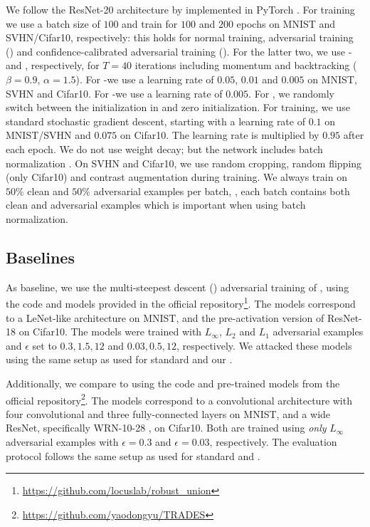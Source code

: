 We follow the ResNet-20 architecture by \cite{HeCVPR2016} implemented in PyTorch \citep{PaszkeNIPSWORK2017}. For training we use a batch size of $100$ and train for $100$ and $200$ epochs on MNIST and SVHN/Cifar10, respectively: this holds for normal training, adversarial training (\AdvTrain) and confidence-calibrated adversarial training (\ConfTrain). For the latter two, we use \PGD-\FCE and \PGD\FConf, respectively, for $T = 40$ iterations including momentum and backtracking ($\beta = 0.9$, $\alpha = 1.5$). For \PGD-\FCE we use a learning rate of $0.05$, $0.01$ and $0.005$ on MNIST, SVHN and Cifar10. For \PGD-\FConf we use a learning rate of $0.005$. For \ConfTrain, we randomly switch between the initialization in  and zero initialization. For training, we use standard stochastic gradient descent, starting with a learning rate of $0.1$ on MNIST/SVHN and $0.075$ on Cifar10. The learning rate is multiplied by $0.95$ after each epoch. We do not use weight decay; but the network includes batch normalization \citep{IoffeICML2015}. On SVHN and Cifar10, we use random cropping, random flipping (only Cifar10) and contrast augmentation during training. We always train on $50\%$ clean and $50\%$ adversarial examples per batch, \ie, each batch contains both clean and adversarial examples which is important when using batch normalization.

\subsection{Baselines}
\label{subsec:supp-experiments-baselines}

As baseline, we use the multi-steepest descent (\Wong) adversarial training of \cite{MainiICML2020}, using the code and models provided in the official repository\footnote{\url{https://github.com/locuslab/robust_union}}. The models correspond to a LeNet-like \cite{LecunIEEE1998} architecture on MNIST, and the pre-activation version of ResNet-18 \cite{HeCVPR2016} on Cifar10. The models were trained with $L_\infty$, $L_2$ and $L_1$ adversarial examples and $\epsilon$ set to $0.3, 1.5, 12$ and $0.03, 0.5, 12$, respectively. We attacked these models using the same setup as used for standard \AdvTrain and our \ConfTrain. 

Additionally, we compare to \TRADES \cite{ZhangICML2019} using the code and pre-trained models from the official repository\footnote{\url{https://github.com/yaodongyu/TRADES}}. The models correspond to a convolutional architecture with four convolutional and three fully-connected layers \cite{CarliniSP2017} on MNIST, and a wide ResNet, specifically WRN-10-28 \cite{ZagoruykoBMVC2016}, on Cifar10. Both are trained using \emph{only} $L_\infty$ adversarial examples with $\epsilon = 0.3$ and $\epsilon = 0.03$, respectively. The evaluation protocol follows the same setup as used for standard \AdvTrain and \ConfTrain.

